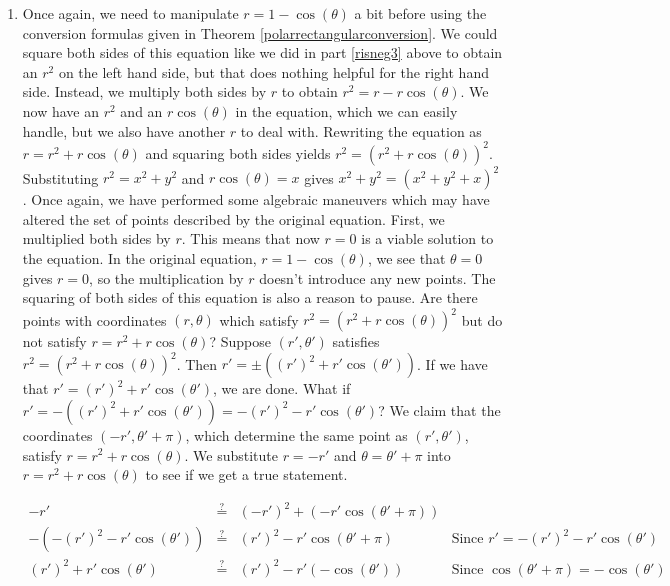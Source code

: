 \begin{ex}
\begin{enumerate}
\begin{enumerate}
\item  Once again, we need to manipulate   $r = 1 - \cos(\theta)$ a bit before using the conversion formulas given in Theorem \ref{polarrectangularconversion}.  We could square both sides of this equation like we did in part \ref{risneg3} above to obtain an $r^2$ on the left hand side, but that does nothing helpful for the right hand side.  Instead, we multiply both sides by $r$ to obtain  $r^{2} = r - r\cos(\theta)$.  We now have an $r^2$ and an $r\cos(\theta)$ in the equation, which we can easily handle, but we also have another $r$ to deal with.  Rewriting the equation as $r = r^{2} + r\cos(\theta)$ and squaring both sides yields $r^2 = \left(r^2 + r\cos(\theta)\right)^2$.  Substituting $r^2 = x^2 + y^2$ and $r\cos(\theta) = x$ gives   $x^2 + y^2 = \left(x^2 + y^2 + x\right)^2$.  Once again, we have performed some algebraic maneuvers which may have altered the set of points described by the original equation.  First, we multiplied both sides by $r$.  This means that now $r=0$ is a viable solution to the equation.  In the original equation, $r = 1 - \cos(\theta)$, we see that $\theta = 0$ gives $r=0$, so the multiplication by $r$ doesn't introduce any new points. The squaring of both sides of this equation is also a reason to pause.  Are there points with coordinates $(r,\theta)$ which satisfy $r^2 = \left(r^2 + r\cos(\theta)\right)^2$ but do not satisfy $r = r^2 + r\cos(\theta)$?  Suppose $\left(r',\theta'\right)$ satisfies $r^2 = \left(r^2 + r\cos(\theta)\right)^2$.  Then $r' = \pm \left((r')^2 + r'\cos(\theta')\right)$.  If we have that $r' = (r')^2 + r'\cos(\theta')$, we are done.  What if $r' = -\left((r')^2 + r'\cos(\theta')\right) = -(r')^{2} - r'\cos(\theta')$?  We claim that the coordinates $(-r', \theta' + \pi)$, which determine the same point as $(r',\theta')$, satisfy $r = r^2 + r\cos(\theta)$. We substitute $r =  -r'$ and $\theta = \theta' + \pi$ into $r = r^2 + r\cos(\theta)$ to see if we get a true statement.

\[ \begin{array}{rclr}

-r' & \stackrel{\text{?}}{=}  & \left(-r'\right)^2 + \left(-r' \cos(\theta' + \pi)\right) & \\ [5pt]

-\left(-(r')^2 - r'\cos(\theta') \right)   & \stackrel{\text{?}}{=}  & (r')^2 - r' \cos(\theta' + \pi) & \text{Since $r' = -(r')^{2} - r'\cos(\theta')$} \\[5pt]

(r')^2 + r'\cos(\theta') & \stackrel{\text{?}}{=}  & (r')^2 - r' (- \cos(\theta')) & \text{Since $\cos(\theta' + \pi) = -\cos(\theta')$} \\[5pt]


\end{array}\]
\end{enumerate}
\end{enumerate}
\end{ex}
